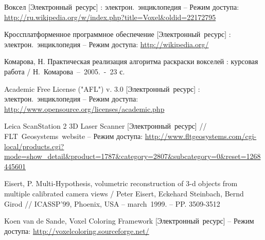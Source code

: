 \renewcommand{\refname}{Список литературы}
\begin{thebibliography}{99}

		Воксел [Электронный~ресурс] : электрон.~энциклопедия -- Режим доступа: \url{http://ru.wikipedia.org/w/index.php?title=Voxel&oldid=22172795}

		Кроссплатформенное программное обеспечение [Электронный~ресурс] : электрон.~энциклопедия -- Режим доступа:
		\url{http://wikipedia.org/}
	
		Комарова, Н. Практическая реализация алгоритма раскраски вокселей : курсовая работа / 
		Н.~Комарова~--~2005.~-~23 с.
	
	
		Academic Free License ("AFL") v. 3.0 [Электронный~ресурс] : электрон.~энциклопедия -- Режим доступа:
		\url{http://www.opensource.org/licenses/academic.php}
	
		Leica ScanStation 2 3D Laser Scanner [Электронный~ресурс] // FLT~Geosystems~website -- Режим доступа:
		\url{http://www.fltgeosystems.com/cgi-local/products.cgi?mode=show_detail&product=1787&category=2807&subcategory=0&reset=1268445601}
	
		Eisert, P. Multi-Hypothesis, volumetric reconstruction of 3-d objects from multiple calibrated camera views /
		Peter Eisert, Eckehard Steinbach, Bernd Girod //
		ICASSP’99, Phoenix, USA -- march~1999. -- PP. 3509-3512
	
		Koen van de Sande, Voxel Coloring Framework [Электронный~ресурс] -- Режим доступа:
		\url{http://voxelcoloring.sourceforge.net/}
		
		
\end{thebibliography}

